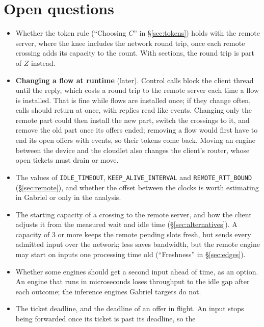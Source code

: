 \documentclass[11pt]{article}
\newcommand{\code}[1]{\texttt{#1}}
\begin{document}
\section{Open questions}
\label{sec:open}

\begin{itemize}[nosep]
  \item Whether the token rule (``Choosing $C$'' in \S\ref{sec:tokens})
        holds with the remote server, where the knee includes the network
        round trip, once each remote crossing adds its capacity to the
        count. With sections, the round trip is part of $Z$ instead.
  \item \textbf{Changing a flow at runtime} (later). Control calls block the
        client thread until the reply, which costs a round trip to the remote
        server each time a flow is installed. That is fine while flows are
        installed once; if they change often, calls should return at once,
        with replies read like events. Changing only the remote part could
        then install the new part, switch the crossings to it, and remove the
        old part once its offers ended; removing a flow would first have to
        end its open offers with events, so their tokens come back. Moving an
        engine between the device and the cloudlet also changes the client's
        router, whose open tickets must drain or move.
  \item The values of \code{IDLE\_TIMEOUT}, \code{KEEP\_ALIVE\_INTERVAL} and
        \code{REMOTE\_RTT\_BOUND} (\S\ref{sec:remote}), and whether the
        offset between the clocks is worth estimating in Gabriel or only in
        the analysis.
  \item The starting capacity of a crossing to the remote server, and how the
        client adjusts it from the measured wait and idle time
        (\S\ref{sec:alternatives}). A
        capacity of 3 or more keeps the remote pending slots fresh, but sends
        every admitted input over the network; less saves bandwidth, but the
        remote engine may start on inputs one processing time old
        (``Freshness'' in \S\ref{sec:edges}).
  \item Whether some engines should get a second input ahead of time, as an
        option. An engine that runs in microseconds loses throughput to the
        idle gap after each outcome; the inference engines Gabriel targets do
        not.
  \item The ticket deadline, and the deadline of an offer in flight. An input
        stops being forwarded once its ticket is past its deadline, so the

\end{itemize}
\end{document}
